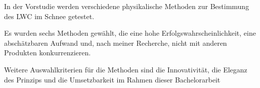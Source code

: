 
In der Vorstudie werden verschiedene physikalische Methoden zur Bestimmung des LWC im Schnee getestet.

Es wurden sechs Methoden gewählt, die eine hohe Erfolgswahrscheinlichkeit, eine abschätzbaren Aufwand und, nach meiner Recherche, nicht mit anderen Produkten konkurrenzieren.

Weitere Auswahlkriterien für die Methoden sind die Innovativität, die Eleganz des Prinzips und die Umsetzbarkeit im Rahmen dieser Bachelorarbeit
